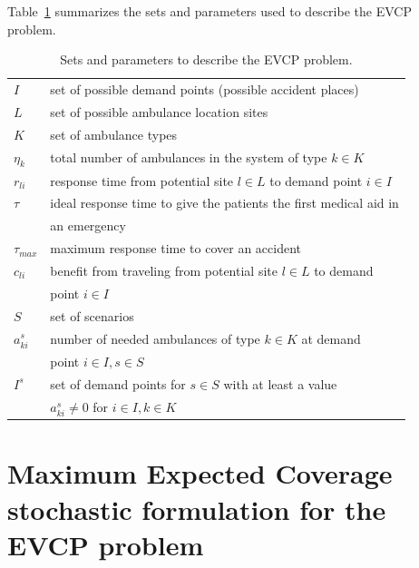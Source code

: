 Table~\ref{general_parameters} summarizes the sets and parameters used to describe the EVCP problem.
\begin{table}[htb]
\centering
\begin{tabular}{ll}
\hline
$I$      & set of possible demand points (possible accident places)   \\
$L$          & set of possible ambulance location sites                         \\
$K$          & set of ambulance types                         \\
$\eta_k$    & total number of ambulances in the system of type $k \in K$                  \\
$r_{li}$ & response time from potential site $l \in L$ to demand point $i \in I$       \\
$\tau$       &    ideal response time to give the patients the first medical aid in \\ & an emergency                                  \\
$\tau_{max}$ &     maximum response time to cover an accident                                           \\ 
$c_{li}$ & benefit from traveling from potential site $l \in L$ to demand \\ & point $i \in I$   \\
\hline
$S$      & set of scenarios \\
$a_{ki}^s$ & number of needed ambulances of type $k \in K$ at demand \\ & point $ i \in I, s \in S$                          \\
$I^s$         &   set of demand points for $s\in S$ with at least a value \\ & $a_{ki}^s \neq 0$ for $ i \in I, k\in K$  \\
\hline
\end{tabular}
\caption{Sets and parameters to describe the EVCP problem.}
\label{general_parameters}
\end{table}

 


\section{Maximum Expected Coverage stochastic formulation for the EVCP problem}\label{sec:Modelo1}



